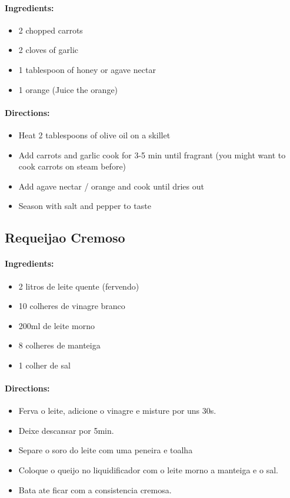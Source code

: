 \documentclass{article}
\begin{document}
\paragraph{Ingredients:}
\begin{itemize}
    \item 2 chopped carrots
    \item 2 cloves of garlic
    \item 1 tablespoon of honey or agave nectar
    \item 1 orange (Juice the orange)
\end{itemize}

\paragraph{Directions:}
\begin{itemize}
    \item Heat 2 tablespoons of olive oil on a skillet
    \item Add carrots and garlic cook for 3-5 min until fragrant (you might want to cook carrots on steam before)
    \item Add agave nectar / orange and cook until dries out
    \item Season with salt and pepper to taste
\end{itemize}

\subsection{Requeijao Cremoso}

\paragraph{Ingredients:}
\begin{itemize}
    \item 2 litros de leite quente (fervendo)
    \item 10 colheres de vinagre branco
    \item 200ml de leite morno
    \item 8 colheres de manteiga
    \item 1 colher de sal
\end{itemize}

\paragraph{Directions:}
\begin{itemize}
    \item Ferva o leite, adicione o vinagre e misture por uns 30s.
    \item Deixe descansar por 5min.
    \item Separe o soro do leite com uma peneira e toalha
    \item Coloque o queijo no liquidificador com o leite morno a manteiga e o sal.
    \item Bata ate ficar com a consistencia cremosa.
\end{itemize}
\end{document}
